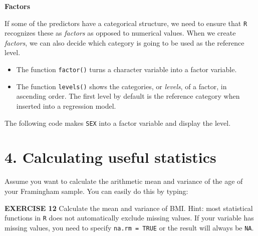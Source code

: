 \documentclass[
]{article}
\newenvironment{Shaded}{\begin{snugshade}}{\end{snugshade}}
\newcommand{\FunctionTok}[1]{\textcolor[rgb]{0.00,0.00,0.00}{#1}}
\newcommand{\NormalTok}[1]{#1}
\newcommand{\OtherTok}[1]{\textcolor[rgb]{0.56,0.35,0.01}{#1}}
\newcommand{\SpecialCharTok}[1]{\textcolor[rgb]{0.00,0.00,0.00}{#1}}
\begin{document}
\textbf{Factors}

If some of the predictors have a categorical structure, we need to
ensure that \texttt{R} recognizes these as \emph{factors} as opposed to
numerical values. When we create \emph{factors}, we can also decide
which category is going to be used as the reference level.

\begin{itemize}
\item
  The function \texttt{factor()} turns a character variable into a
  factor variable.
\item
  The function \texttt{levels()} shows the categories, or \emph{levels},
  of a factor, in ascending order. The first level by default is the
  reference category when inserted into a regression model.
\end{itemize}

The following code makes \texttt{SEX} into a factor variable and display
the level.

\begin{Shaded}
\end{Shaded}

\hypertarget{calculating-useful-statistics}{%
\section{4. Calculating useful
statistics}\label{calculating-useful-statistics}}

Assume you want to calculate the arithmetic mean and variance of the age
of your Framingham sample. You can easily do this by typing:

\begin{Shaded}
\end{Shaded}

\textbf{EXERCISE 12} Calculate the mean and variance of BMI. Hint: most
statistical functions in \texttt{R} does not automatically exclude
missing values. If your variable has missing values, you need to specify
\texttt{na.rm\ =\ TRUE} or the result will always be \texttt{NA}.
\end{document}
